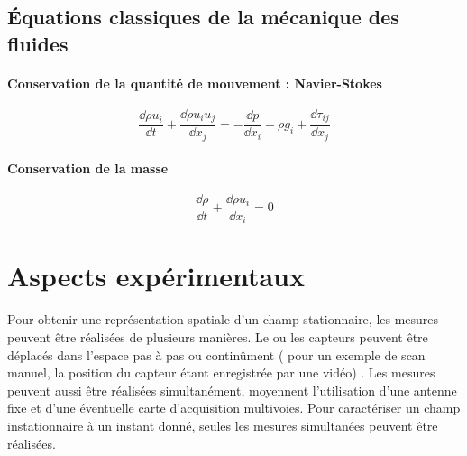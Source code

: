 \subsection{Équations classiques de la mécanique des fluides}
\vspace{0.3cm}\paragraph{Conservation de la quantité de mouvement : Navier-Stokes}
\begin{equation}
	\frac{\dd \rho u_i}{\dd t} + \frac{\dd \rho u_i u_j}{\dd x_j} = -\frac{\dd p}{\dd x_i} + \rho g_i + \frac{\dd \tau_{ij}}{\dd x_j}
\end{equation}
\paragraph{Conservation de la masse}
\begin{equation}
 \frac{\dd \rho}{\dd t} + \frac{\dd \rho u_{i}}{\dd x_i} = 0
\end{equation}












\section{Aspects expérimentaux}

Pour obtenir une représentation spatiale d'un champ stationnaire, les mesures peuvent être réalisées de plusieurs manières. Le ou les capteurs peuvent être déplacés dans l'espace pas à pas ou continûment (\cite{Comesana2013} pour un exemple de scan manuel, la position du capteur étant enregistrée par une vidéo) . Les mesures peuvent aussi être réalisées simultanément, moyennent l'utilisation d'une antenne fixe et d'une éventuelle carte d'acquisition multivoies. Pour caractériser un champ instationnaire à un instant donné, seules les mesures simultanées peuvent être réalisées.

